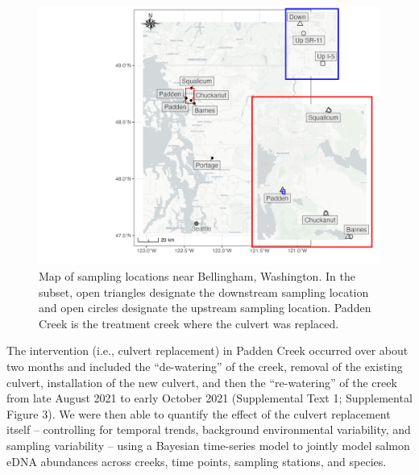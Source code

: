\documentclass[
]{article}
\begin{document}
\begin{figure}
\centering
\includegraphics{../Output/Figures/SiteMap.png}
\caption{Map of sampling locations near Bellingham, Washington. In the
subset, open triangles designate the downstream sampling location and
open circles designate the upstream sampling location. Padden Creek is
the treatment creek where the culvert was replaced.\label{fig:map}}
\end{figure}

The intervention (i.e., culvert replacement) in Padden Creek occurred
over about two months and included the ``de-watering'' of the creek,
removal of the existing culvert, installation of the new culvert, and
then the ``re-watering'' of the creek from late August 2021 to early
October 2021 (Supplemental Text 1; Supplemental Figure 3). We were then
able to quantify the effect of the culvert replacement itself --
controlling for temporal trends, background environmental variability,
and sampling variability -- using a Bayesian time-series model to
jointly model salmon eDNA abundances across creeks, time points,
sampling stations, and species.
\end{document}
